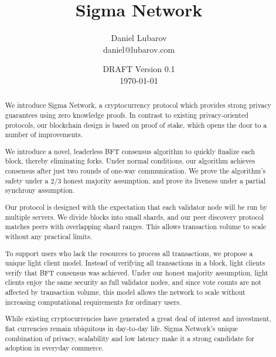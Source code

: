 \documentclass[12pt]{article}
\title{Sigma Network}
\author{Daniel Lubarov\\daniel@lubarov.com}
\date{DRAFT Version 0.1\\\today}
\begin{document}
\maketitle

\begin{abstract}
  We introduce Sigma Network, a cryptocurrency protocol which provides strong privacy guarantees using zero knowledge proofs. In contrast to existing privacy-oriented protocols, our blockchain design is based on proof of stake, which opens the door to a number of improvements.

  We introduce a novel, leaderless BFT consensus algorithm to quickly finalize each block, thereby eliminating forks. Under normal conditions, our algorithm achieves consensus after just two rounds of one-way communication. We prove the algorithm's safety under a 2/3 honest majority assumption, and prove its liveness under a partial synchrony assumption.

  Our protocol is designed with the expectation that each validator node will be run by multiple servers. We divide blocks into small shards, and our peer discovery protocol matches peers with overlapping shard ranges. This allows transaction volume to scale without any practical limits.

  To support users who lack the resources to process all transactions, we propose a unique light client model. Instead of verifying all transactions in a block, light clients verify that BFT consensus was achieved. Under our honest majority assumption, light clients enjoy the same security as full validator nodes, and since vote counts are not affected by transaction volume, this model allows the network to scale without increasing computational requirements for ordinary users.

  While existing cryptocurrencies have generated a great deal of interest and investment, fiat currencies remain ubiquitous in day-to-day life. Sigma Network's unique combination of privacy, scalability and low latency make it a strong candidate for adoption in everyday commerce.
\end{abstract}

\newpage
{\hypersetup{hidelinks} \tableofcontents}
\newpage










{}

\end{document}
